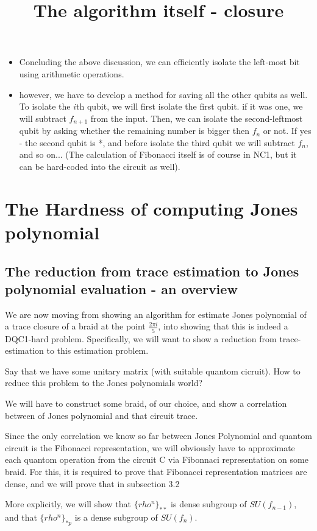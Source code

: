 \documentclass{article}
\begin{document}
\title{The algorithm itself - closure}
\begin{itemize}
\item Concluding the above discussion, we can efficiently isolate the left-most bit using arithmetic operations.
\item however, we have to develop a method for saving all the other qubits as well. To isolate the $i$th qubit, we will first isolate the first qubit. if it was one, we will subtract $f_{n+1}$ from the input. Then, we can isolate the second-leftmost qubit by asking whether the remaining number is bigger then $f_{n}$ or not. If yes - the second qubit is *, and before isolate the third qubit we will subtract $f_{n}$, and so on... (The calculation of Fibonacci itself is of course in NC1, but it can be hard-coded into the circuit as well).
\end{itemize}






\section{The Hardness of computing Jones polynomial}
\subsection{The reduction from trace estimation to Jones polynomial evaluation - an overview}

We are now moving from showing an algorithm for estimate Jones polynomial of a trace closure of a braid at the point $\frac{2{\pi}i}{5}$, into showing that this is indeed a DQC1-hard problem. Specifically, we will want to show a reduction from trace-estimation to this estimation problem.

Say that we have some unitary matrix (with suitable quantom cicruit). How to reduce this problem to the Jones polynomials world?

We will have to construct some braid, of our choice, and show a correlation between of Jones polynomial and that circuit trace.

Since the only correlation we know so far between Jones Polynomial and quantom circuit is the Fibonacci representation, we will obviously have to approximate each quantom operation from the circuit C via Fibonnaci representation on some braid. For this, it is required to prove that Fibonacci representation matrices are dense, and we will prove that in subsection 3.2

More explicitly, we will show that $\{rho^{n}\}_{**}$ is dense subgroup of $SU(f_{n-1})$, and that $\{rho^{n}\}_{*p}$ is a dense subgroup of $SU(f_{n})$.
\end{document}
